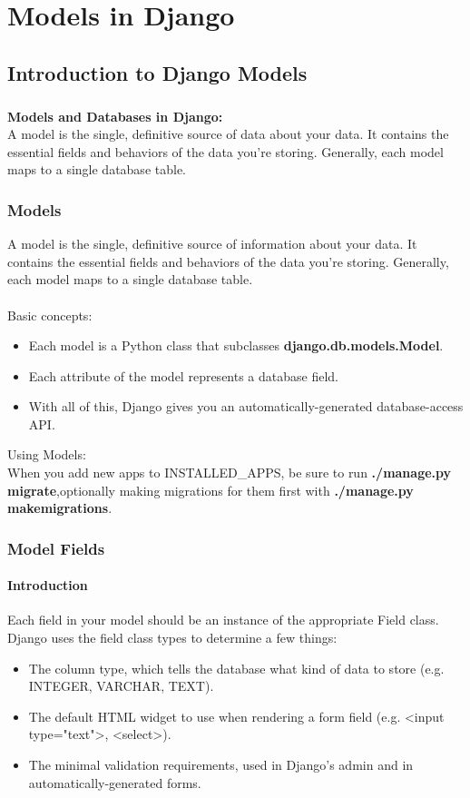 \chapter{Models in Django}
\section{Introduction to Django Models}
\paragraph{} \textbf{Models and Databases in Django:}\\
A model is the single, definitive source of data about your data. It contains the essential fields and behaviors of the
data you're storing. Generally, each model maps to a single database table.
\subsection{Models}
A model is the single, definitive source of information about your data. It contains the essential fields and behaviors
of the data you're storing. Generally, each model maps to a single database table.
\\ \\ Basic concepts:
\begin{itemize}
	\item Each model is a Python class that subclasses \textbf{django.db.models.Model}.
	\item Each attribute of the model represents a database field.
	\item With all of this, Django gives you an automatically-generated database-access API.
\end{itemize}
 Using Models:\\
When you add new apps to INSTALLED\_APPS, be sure to run \textbf{./manage.py migrate},optionally making migrations for them first with \textbf{./manage.py makemigrations}.

\newpage
\subsection{Model Fields}
\subsubsection{Introduction}
Each field in your model should be an instance of the appropriate Field class. Django uses the field class types to
determine a few things:
\begin{itemize}
	\item The column type, which tells the database what kind of data to store (e.g. INTEGER, VARCHAR, TEXT).
	\item The default HTML widget to use when rendering a form field (e.g. <input type="text">, <select>).
	\item The minimal validation requirements, used in Django's admin and in automatically-generated forms.
\end{itemize}
